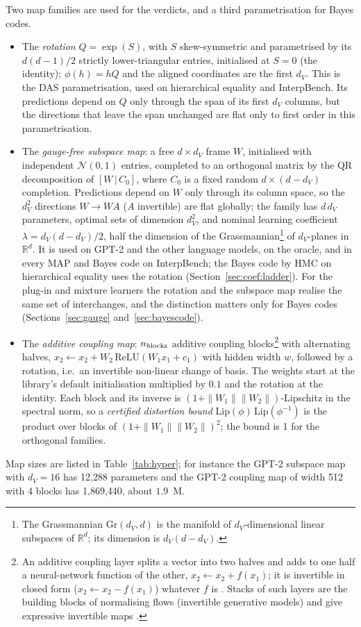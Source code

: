 \documentclass[11pt,a4paper]{article}
\newcommand{\dv}{d_V}
\begin{document}
Two map families are used for the verdicts, and a third parametrisation for Bayes codes.
\begin{itemize}
\item The \emph{rotation} $Q=\exp(S)$, with $S$ skew-symmetric and parametrised by its $d(d-1)/2$ strictly lower-triangular entries, initialised at $S=0$ (the identity); $\phi(h)=hQ$ and the aligned coordinates are the first $\dv$. This is the DAS parametrisation, used on hierarchical equality and InterpBench. Its predictions depend on $Q$ only through the span of its first $\dv$ columns, but the directions that leave the span unchanged are flat only to first order in this parametrisation.
\item The \emph{gauge-free subspace map}: a free $d\times\dv$ frame $W$, initialised with independent $\mathcal N(0,1)$ entries, completed to an orthogonal matrix by the QR decomposition of $[W\,|\,C_0]$, where $C_0$ is a fixed random $d\times(d-\dv)$ completion. Predictions depend on $W$ only through its column space, so the $\dv^2$ directions $W\to WA$ ($A$ invertible) are flat globally; the family has $d\,\dv$ parameters, optimal sets of dimension $\dv^2$, and nominal learning coefficient $\lambda=\dv(d-\dv)/2$, half the dimension of the Grassmannian\footnote{The Grassmannian $\mathrm{Gr}(\dv,d)$ is the manifold of $\dv$-dimensional linear subspaces of $\mathbb R^d$; its dimension is $\dv(d-\dv)$.} of $\dv$-planes in $\mathbb R^d$. It is used on GPT-2 and the other language models, on the oracle, and in every MAP and Bayes code on InterpBench; the Bayes code by HMC on hierarchical equality uses the rotation (Section~\ref{sec:coef:ladder}). For the plug-in and mixture learners the rotation and the subspace map realise the same set of interchanges, and the distinction matters only for Bayes codes (Sections~\ref{sec:gauge} and~\ref{sec:bayescode}).
\item The \emph{additive coupling map}: $n_{\rm blocks}$ additive coupling blocks\footnote{An additive coupling layer splits a vector into two halves and adds to one half a neural-network function of the other, $x_2\leftarrow x_2+f(x_1)$; it is invertible in closed form ($x_2\leftarrow x_2-f(x_1)$) whatever $f$ is \cite{dinh2015}. Stacks of such layers are the building blocks of normalising flows (invertible generative models) and give expressive invertible maps \cite{dinh2017,teshima2020}.} with alternating halves, $x_2\leftarrow x_2+W_2\,\mathrm{ReLU}(W_1x_1+c_1)$ with hidden width $w$, followed by a rotation, i.e.\ an invertible non-linear change of basis. The weights start at the library's default initialisation multiplied by $0.1$ and the rotation at the identity. Each block and its inverse is $(1+\|W_1\|\|W_2\|)$-Lipschitz in the spectral norm, so a \emph{certified distortion bound} $\mathrm{Lip}(\phi)\,\mathrm{Lip}(\phi^{-1})$ is the product over blocks of $(1+\|W_1\|\|W_2\|)^2$; the bound is 1 for the orthogonal families.
\end{itemize}
Map sizes are listed in Table~\ref{tab:hyper}; for instance the GPT-2 subspace map with $\dv=16$ has 12{,}288 parameters and the GPT-2 coupling map of width 512 with 4 blocks has 1{,}869{,}440, about $1.9$~M.
\end{document}
